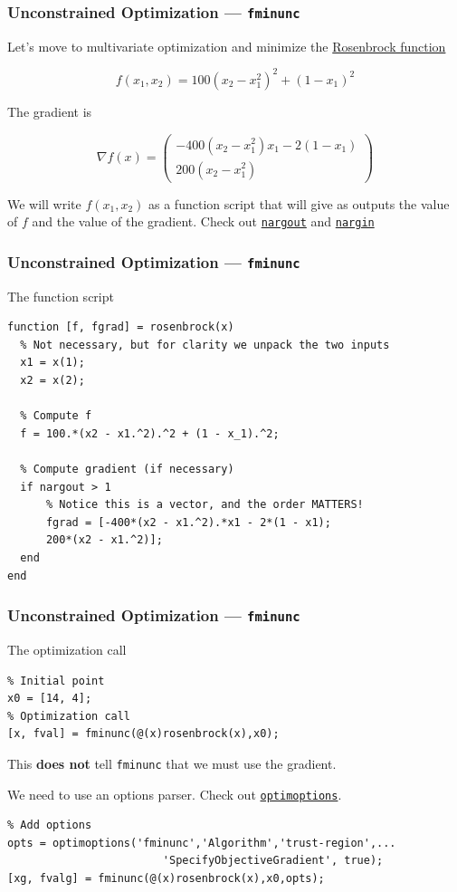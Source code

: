 \documentclass[11pt,xcolor={svgnames},aspectratio=169,usepdftitle=false]{beamer}
\let\toneitemize\itemize
\let\ttwoitemize\enditemize
\renewenvironment{itemize}{\toneitemize\addtolength{\itemsep}{0.7\baselineskip}}{\ttwoitemize}
\begin{document}
\begin{frame}
  \frametitle{Unconstrained Optimization --- \texttt{fminunc}}
Let's move to multivariate optimization and minimize the \href{https://en.wikipedia.org/wiki/Rosenbrock_function}{Rosenbrock function}

\[
f(x_1,x_2) = 100 \left(x_2 - x^2_1\right)^2 + \left(1 - x_1\right)^2
\]

The gradient is

\[
\nabla f(x) = \begin{pmatrix}
  -400(x_2 - x_1^2)x_1 - 2(1 - x_1) \\
  200(x_2 - x^2_1)
\end{pmatrix}  
\]

We will write $f(x_1, x_2)$ as a function script that will give as outputs the value of $f$ and the value of the gradient. {\tiny Check out \href{https://www.mathworks.com/help/matlab/ref/nargout.html}{\texttt{nargout}} and \href{https://www.mathworks.com/help/matlab/ref/nargin.html}{\texttt{nargin}}}
\end{frame}

\begin{frame}[fragile]
  \frametitle{Unconstrained Optimization --- \texttt{fminunc}}
  \begin{itemize}
    \item The function script
  \end{itemize}
\begin{lstlisting}
function [f, fgrad] = rosenbrock(x)
  % Not necessary, but for clarity we unpack the two inputs
  x1 = x(1);
  x2 = x(2);

  % Compute f
  f = 100.*(x2 - x1.^2).^2 + (1 - x_1).^2;

  % Compute gradient (if necessary)
  if nargout > 1
      % Notice this is a vector, and the order MATTERS!
      fgrad = [-400*(x2 - x1.^2).*x1 - 2*(1 - x1);
      200*(x2 - x1.^2)];
  end
end
\end{lstlisting}
\end{frame}

\begin{frame}[fragile]
  \frametitle{Unconstrained Optimization --- \texttt{fminunc}}
  \begin{itemize}
    \item The optimization call
    \begin{lstlisting}
% Initial point
x0 = [14, 4];
% Optimization call
[x, fval] = fminunc(@(x)rosenbrock(x),x0);
    \end{lstlisting}
    \item This \alert{\textbf{does not}} tell \verb;fminunc; that we must use the gradient.
    \item We need to use an options parser. Check out \href{https://www.mathworks.com/help/optim/ug/optim.problemdef.optimizationproblem.optimoptions.html}{\texttt{optimoptions}}.
    \begin{lstlisting}
% Add options
opts = optimoptions('fminunc','Algorithm','trust-region',...
                        'SpecifyObjectiveGradient', true);
[xg, fvalg] = fminunc(@(x)rosenbrock(x),x0,opts);
    \end{lstlisting}
  \end{itemize}
\end{frame}
\end{document}
